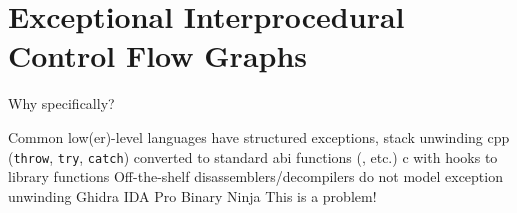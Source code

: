 \section{Exceptional Interprocedural Control Flow Graphs}

\begin{frame}{Why  specifically?}
  \begin{outline}
    \1 Common low(er)-level languages have structured exceptions, stack unwinding
      \2 \Gls{cpp} (\lstinline|throw|, \lstinline|try|, \lstinline|catch|) converted to standard \gls{abi} functions (, etc.)
      \2 \Gls{c} with hooks to library functions
    \1 Off-the-shelf \alert{disassemblers/decompilers} do not model exception unwinding
      \2 Ghidra
      \2 IDA Pro
      \2 Binary Ninja
    \1 This is a problem!
  \end{outline}
\end{frame}

